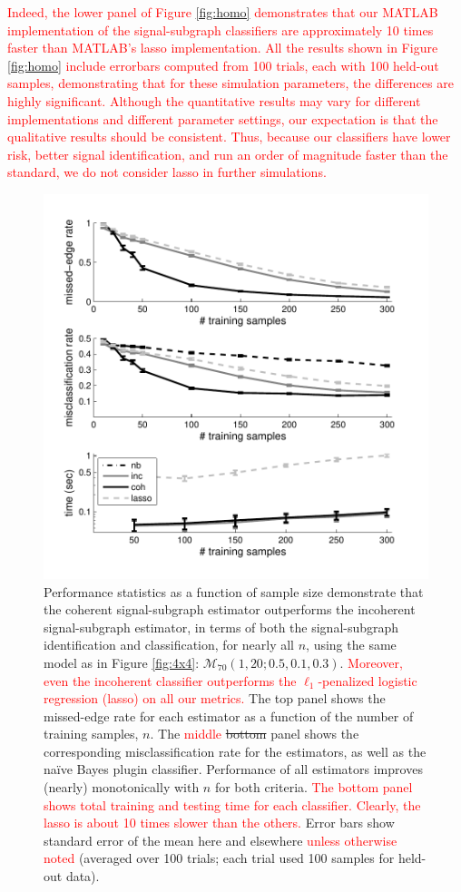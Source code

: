 \documentclass[10pt,journal,cspaper,compsoc]{IEEEtran}
\providecommand{\tr}[1]{\textcolor{red}{#1}}
\providecommand{\mc}[1]{\mathcal{#1}}
\begin{document}
\tr{Indeed, the lower panel of Figure \ref{fig:homo} demonstrates that our MATLAB implementation of the signal-subgraph classifiers are approximately 10 times faster than MATLAB's lasso implementation.  All the results shown in Figure \ref{fig:homo} include errorbars computed from 100 trials, each with 100 held-out samples, demonstrating that for these simulation parameters, the differences are highly significant.  Although the quantitative results may vary for different implementations and different parameter settings, our expectation is that the qualitative results should be consistent.  Thus, because our classifiers have lower risk, better signal identification, and run an order of magnitude faster than the standard, we do not consider lasso in further simulations.}


\begin{figure}[htbp]
	\centering
		\includegraphics[width=1.0\linewidth]{../figs/fig3_homo_V70_s20_p10_q30_Lhats.pdf}
	\caption{Performance statistics as a function of sample size demonstrate that the coherent signal-subgraph estimator outperforms the incoherent signal-subgraph estimator, in terms of both the signal-subgraph identification and classification, for nearly all $n$, using the same model as in Figure \ref{fig:4x4}: $\mc{M}_{70}(1,20;0.5,0.1,0.3)$.  \tr{Moreover, even the incoherent classifier outperforms the $\ell_1$-penalized logistic regression (lasso) on all our metrics.}	The top panel shows the missed-edge rate for each estimator as a function of the number of training samples, $n$.  The \tr{middle} \sout{bottom} panel shows the corresponding misclassification rate for the estimators, as well as the na\"ive Bayes plugin classifier.  Performance of all estimators improves (nearly) monotonically with $n$ for both criteria. \tr{The bottom panel shows total training and testing time for each classifier.  Clearly, the lasso is about 10 times slower than the others.} Error bars show standard error of the mean here and elsewhere \tr{unless otherwise noted} (averaged over 100 trials; each trial used 100 samples for held-out data). 
}
\end{figure}
\end{document}
